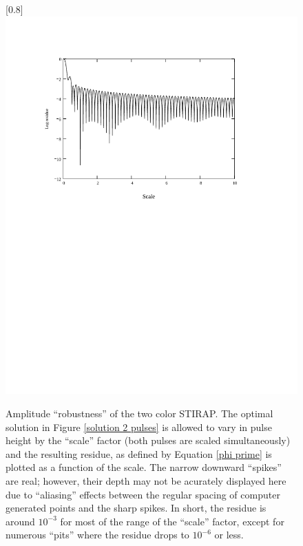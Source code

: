 \begin{figure}
\scalebox{0.8}[0.8]{
\includegraphics[bb=30 415 489 715]
{scale_two-color/scale_two-color.pdf}
}
\caption[Amplitude ``robustness'' of the two color STIRAP]{Amplitude ``robustness'' of the two color STIRAP. The optimal solution in Figure \ref{solution 2 pulses} is allowed to vary in pulse height by the ``scale'' factor (both pulses are scaled simultaneously) and the resulting residue, as defined by Equation \ref{phi prime} is plotted as a function of the scale. The narrow downward ``spikes'' are real; however, their depth may not be acurately displayed here due to ``aliasing'' effects between the regular spacing of computer generated points and the sharp spikes. In short, the residue is around $10^{-3}$ for most of the range of the ``scale'' factor, except for numerous ``pits'' where the residue drops to $10^{-6}$ or less.}
\label{scale_two-color}
\end{figure}
